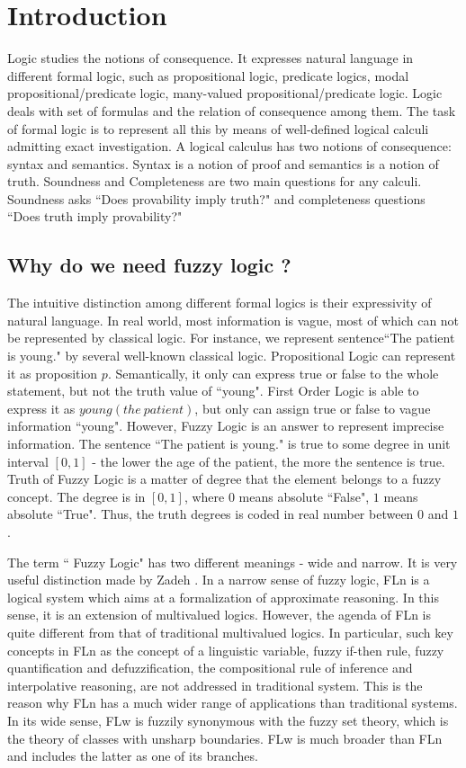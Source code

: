 \documentclass[Thesis.tex]{subfiles}
\begin{document}
\section{Introduction}
\label{chap:Introduction}
Logic studies the notions of consequence. It expresses natural language in different formal logic, such as propositional logic, predicate logics, modal propositional/predicate logic, many-valued propositional/predicate logic. Logic deals with set of formulas and the relation of consequence among them. The task of formal logic is to represent all this by means of well-defined logical calculi admitting exact investigation. A logical calculus has two notions of consequence: syntax and semantics. Syntax is a notion of proof and semantics is a notion of truth. Soundness and Completeness are two main questions for any calculi. Soundness asks ``Does provability imply truth?" and completeness questions ``Does truth imply provability?"

\subsection{Why do we need fuzzy logic ?}
The intuitive distinction among different formal logics is their expressivity of natural language. In real world, most information is vague, most of which can not be represented by classical logic. For instance, we represent sentence``The patient is young." by several well-known classical logic. Propositional Logic can represent it as proposition $p$. Semantically, it only can express true or false to the whole statement, but not the truth value of ``young". First Order Logic is able to express it as $young(the\ patient)$, but only can assign true or false to vague information ``young". However, Fuzzy Logic is an answer to represent imprecise information. The sentence ``The patient is young." is true to some degree in unit interval $[0,1]$ - the lower the age of the patient, the more the sentence is true. Truth of Fuzzy Logic is a matter of degree that the element belongs to a fuzzy concept. The degree is in $[0,1]$, where $0$ means absolute ``False", $1$ means absolute ``True". Thus, the truth degrees is coded in real number between $0$ and $1$.

The term `` Fuzzy Logic" has two different meanings - wide and narrow. It is very useful distinction made by Zadeh \cite{Z96}. In a narrow sense of fuzzy logic, FLn is a logical system which aims at a formalization of  approximate reasoning. In this sense, it is an extension of multivalued logics. 
However, the agenda of FLn is quite different from that of traditional multivalued logics. In particular, such key concepts in FLn as the concept of a linguistic variable, fuzzy if-then rule, fuzzy quantification and defuzzification, the compositional rule of inference and interpolative reasoning, are not addressed in traditional system. This is the reason why FLn has a much wider range of applications than traditional systems. In its wide sense, FLw is fuzzily synonymous with the fuzzy set theory, which is the theory of classes with unsharp boundaries. FLw is much broader than FLn and includes the latter as one of its branches.
\end{document}
